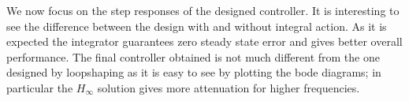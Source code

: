 We now focus on the step responses of the designed controller. It is interesting to see the difference between the design with and without integral action. As it is expected the integrator guarantees zero steady state error and gives better overall performance. The final controller obtained is not much different from the one designed by loopshaping as it is easy to see by plotting the bode diagrams; in particular the $H_\infty$ solution gives more attenuation for higher frequencies.\\

